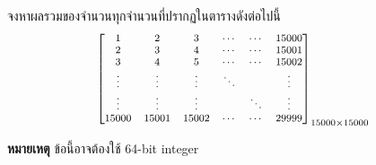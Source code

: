 \question{}

จงหาผลรวมของจำนวนทุกจำนวนที่ปรากฏในตารางดังต่อไปนี้
\[
    \footnotesize
    \begin{bmatrix}
        1 & 2 & 3 & \cdots & \cdots & 15000 \\
        2 & 3 & 4 & \cdots & \cdots & 15001 \\
        3 & 4 & 5 & \cdots & \cdots & 15002 \\
        \vdots & \vdots & \vdots & \ddots & & \vdots \\
        \vdots & \vdots & \vdots & & \ddots & \vdots \\
        15000 & 15001 & 15002 & \cdots & \cdots & 29999 \\
    \end{bmatrix}_{15000 \times 15000}
\]

\textbf{หมายเหตุ}\; ข้อนี้อาจต้องใช้ 64-bit integer